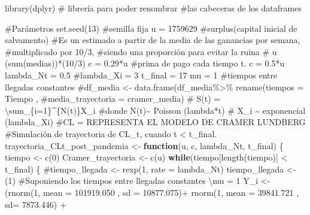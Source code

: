 \documentclass[
  us-letterpaper,
]{scrreprt}
\newenvironment{Shaded}{\begin{snugshade}}{\end{snugshade}}
\newcommand{\AttributeTok}[1]{\textcolor[rgb]{0.40,0.45,0.13}{#1}}
\newcommand{\CommentTok}[1]{\textcolor[rgb]{0.37,0.37,0.37}{#1}}
\newcommand{\ControlFlowTok}[1]{\textcolor[rgb]{0.00,0.23,0.31}{\textbf{#1}}}
\newcommand{\DecValTok}[1]{\textcolor[rgb]{0.68,0.00,0.00}{#1}}
\newcommand{\FloatTok}[1]{\textcolor[rgb]{0.68,0.00,0.00}{#1}}
\newcommand{\FunctionTok}[1]{\textcolor[rgb]{0.28,0.35,0.67}{#1}}
\newcommand{\NormalTok}[1]{\textcolor[rgb]{0.00,0.23,0.31}{#1}}
\newcommand{\OtherTok}[1]{\textcolor[rgb]{0.00,0.23,0.31}{#1}}
\newcommand{\SpecialCharTok}[1]{\textcolor[rgb]{0.37,0.37,0.37}{#1}}
\theoremstyle{plain}
\theoremstyle{plain}
\theoremstyle{definition}
\theoremstyle{remark}
\begin{document}
\begin{Shaded}
\begin{Highlighting}[]
\FunctionTok{library}\NormalTok{(dplyr) }\CommentTok{\# librería para poder renombrar }
\CommentTok{\#las cabeceras de los dataframes}

\CommentTok{\#Parámetros}
\FunctionTok{set.seed}\NormalTok{(}\DecValTok{13}\NormalTok{) }\CommentTok{\#semilla fija}
\NormalTok{u }\OtherTok{=} \DecValTok{1759629} \CommentTok{\#surplus(capital inicial de salvamento)}
\CommentTok{\#Es un estimado a partir de la media de las ganancias por semana, }
\CommentTok{\#multiplicado por 10/3, }
\CommentTok{\#siendo una proporción para evitar la ruina}
\CommentTok{\# u (sum(medias))*(10/3)}
\NormalTok{c }\OtherTok{=} \FloatTok{0.29}\SpecialCharTok{*}\NormalTok{u }\CommentTok{\#prima de pago cada tiempo t. c = 0.5*u}
\NormalTok{lambda\_Nt }\OtherTok{=} \FloatTok{0.5}
\CommentTok{\#lambda\_Xi = 3}
\NormalTok{t\_final }\OtherTok{=} \DecValTok{17}
\NormalTok{mu }\OtherTok{=} \DecValTok{1} \CommentTok{\#tiempos entre llegadas constantes}
\CommentTok{\#df\_media \textless{}{-} data.frame(df\_media\%\textgreater{}\% rename(tiempos = Tiempo ,}
\CommentTok{\#media\_trayectoria = cramer\_media)}
\CommentTok{\# S(t) = \textbackslash{}sum\_\{i=1\}\^{}\{N(t)\}X\_i}
\CommentTok{\#donde N(t)\textasciitilde{} Poisson (lambda*t)}
\CommentTok{\# X\_i \textasciitilde{} exponencial (lambda\_Xi)}
\CommentTok{\#CL = REPRESENTA EL MODELO DE CRAMER LUNDBERG}
\CommentTok{\#Simulación de trayectoria de CL\_t, cuando t \textless{} t\_final.}
\NormalTok{trayectoria\_CLt\_post\_pandemia }\OtherTok{\textless{}{-}} \ControlFlowTok{function}\NormalTok{(u, c, lambda\_Nt, t\_final)}
\NormalTok{\{}
\NormalTok{  tiempo }\OtherTok{\textless{}{-}} \FunctionTok{c}\NormalTok{(}\DecValTok{0}\NormalTok{)}
\NormalTok{  Cramer\_trayectoria }\OtherTok{\textless{}{-}} \FunctionTok{c}\NormalTok{(u)}
  \ControlFlowTok{while}\NormalTok{(tiempo[}\FunctionTok{length}\NormalTok{(tiempo)] }\SpecialCharTok{\textless{}}\NormalTok{ t\_final)}
\NormalTok{  \{}
    \CommentTok{\#tiempo\_llegada \textless{}{-} rexp(1, rate = lambda\_Nt)}
\NormalTok{    tiempo\_llegada }\OtherTok{\textless{}{-}}\NormalTok{ (}\DecValTok{1}\NormalTok{) }
\CommentTok{\#Suponiendo los tiempos entre llegadas constantes \textbackslash{}mu = 1}
\NormalTok{    Y\_i }\OtherTok{\textless{}{-}}\NormalTok{  (}\FunctionTok{rnorm}\NormalTok{(}\DecValTok{1}\NormalTok{, }\AttributeTok{mean =} \FloatTok{101919.050}\NormalTok{ , }\AttributeTok{sd =} \FloatTok{10877.075}\NormalTok{)}\SpecialCharTok{+} 
              \FunctionTok{rnorm}\NormalTok{(}\DecValTok{1}\NormalTok{, }\AttributeTok{mean =}  \FloatTok{39841.721}\NormalTok{ , }\AttributeTok{sd=} \FloatTok{7873.446}\NormalTok{) }\SpecialCharTok{+} 

\end{Highlighting}
\end{Shaded}
\end{document}
